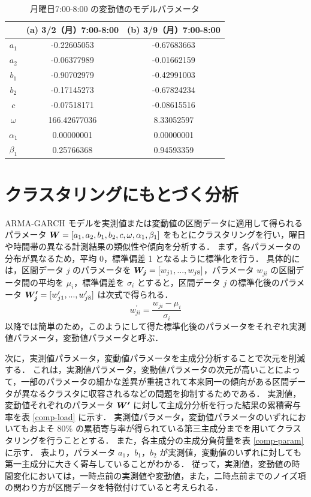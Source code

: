 \documentclass[technicalreport]{ieicej}
\begin{document}
\begin{table}[tb]
\centering
\caption{月曜日7:00-8:00 の変動値のモデルパラメータ}
\label{diff-param}
\begin{tabular}{|c|c|c|}
\hline
&(a) 3/2（月）7:00-8:00&(b) 3/9（月）7:00-8:00\\
\hline
$a_1$&-0.22605053&-0.67683663\\
\hline
$a_2$&-0.06377989&-0.01662159\\
\hline
$b_1$&-0.90702979&-0.42991003\\
\hline
$b_2$&-0.17145273&-0.67824234\\
\hline
$c$&-0.07518171&-0.08615516\\
\hline
$\omega$&166.42677036&8.33052597\\
\hline
$\alpha_1$&0.00000001&0.00000001\\
\hline
$\beta_1$&0.25766368&0.94593359\\
\hline
\end{tabular}
\end{table}

\section{クラスタリングにもとづく分析}
 ARMA-GARCH モデルを実測値または変動値の区間データに適用して得られるパラメータ $\mbox{\boldmath $W$} = [a_1, a_2, b_1, b_2, c, \omega, \alpha_1, \beta_1]$ をもとにクラスタリングを行い，曜日や時間帯の異なる計測結果の類似性や傾向を分析する．
 まず，各パラメータの分布が異なるため，平均 0，標準偏差 1 となるように標準化を行う．
具体的には，区間データ $j$ のパラメータを $\mbox{\boldmath $W_j$} = [w_{j1},...,w_{j8}]$，パラメータ $w_{ji}$ の区間データ間の平均を $\mu_i$，標準偏差を $\sigma_i$ とすると，区間データ $j$ の標準化後のパラメータ $\mbox{\boldmath $W_j^\prime$} = [w_{j1}^\prime,...,w_{j8}^\prime]$ は次式で得られる．
$$w_{ji}^\prime = \frac{w_{ji} - \mu_i}{\sigma_i}$$
以降では簡単のため，このようにして得た標準化後のパラメータをそれぞれ実測値パラメータ，変動値パラメータと呼ぶ． 

次に，実測値パラメータ，変動値パラメータを主成分分析\cite{jolliffe2016principal}することで次元を削減する．
これは，実測値パラメータ，変動値パラメータの次元が高いことによって，一部のパラメータの細かな差異が重視されて本来同一の傾向がある区間データが異なるクラスタに収容されるなどの問題を抑制するためである．
実測値，変動値それぞれのパラメータ $\mbox{\boldmath $W^\prime$}$ に対して主成分分析を行った結果の累積寄与率を表 \ref{comp-load} に示す．
実測値パラメータ，変動値パラメータのいずれにおいてもおよそ $80\%$ の累積寄与率が得られている第三主成分までを用いてクラスタリングを行うこととする．
また，各主成分の主成分負荷量を表 \ref{comp-param} に示す．
表より，パラメータ $a_1，b_1，b_2$ が実測値，変動値のいずれに対しても第一主成分に大きく寄与していることがわかる．
従って，実測値，変動値の時間変化においては，一時点前の実測値や変動値，また，二時点前までのノイズ項の関わり方が区間データを特徴付けていると考えられる．
\end{document}
